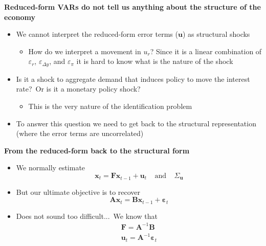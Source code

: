 \documentclass[10pt,handout]{beamer}
\begin{document}
\begin{frame}
{\textbf{Reduced-form VARs do not tell us anything about the structure of
the economy}}

\begin{itemize}
\item We cannot interpret the reduced-form error terms ($\mathbf{u}$) as {%
structural shocks}\smallskip \pause

\begin{itemize}
\item How do we interpret a movement in $u_{r}$? Since it is a linear
combination of $\varepsilon _{r}$, $\varepsilon _{\Delta y}$, and $%
\varepsilon _{\pi }$ it is hard to know what is the nature of the
shock\bigskip \pause
\end{itemize}

\item Is it a shock to aggregate demand that induces policy to move the
interest rate?\ Or is it a monetary policy shock?

\begin{itemize}
\item This is the very nature of the {{\color{red} identification problem}}%
\bigskip \pause
\end{itemize}

\item To answer this question we need to get back to the structural
representation (where the error terms are uncorrelated)
\end{itemize}
\end{frame}

\vspace{.1cm}

\begin{frame}
{\textbf{From the reduced-form back to the structural form}}

\begin{itemize}
\item We normally estimate%
\begin{equation*}
\mathbf{x}_{t}=\mathbf{Fx}_{t-1}+{\mathbf{u}_{t}}\ \ \ \ \ \text{and}\ \ \ \
\ \Sigma _{\mathbf{u}}
\end{equation*}%
\pause

\item But our ultimate objective is to recover 
\begin{equation*}
\mathbf{Ax}_{t}=\mathbf{Bx}_{t-1}+{\mathbf{\varepsilon }_{t}}
\end{equation*}%
\pause

\item Does not sound too difficult...\ We know that%
\begin{equation*}
\begin{array}{l}
\mathbf{F}=\mathbf{A}^{-1}\mathbf{B} \\ 
\mathbf{u}_{t}=\mathbf{A}^{-1}\mathbf{\varepsilon }_{t}%
\end{array}%
\end{equation*}
\end{itemize}
\end{frame}
\end{document}

